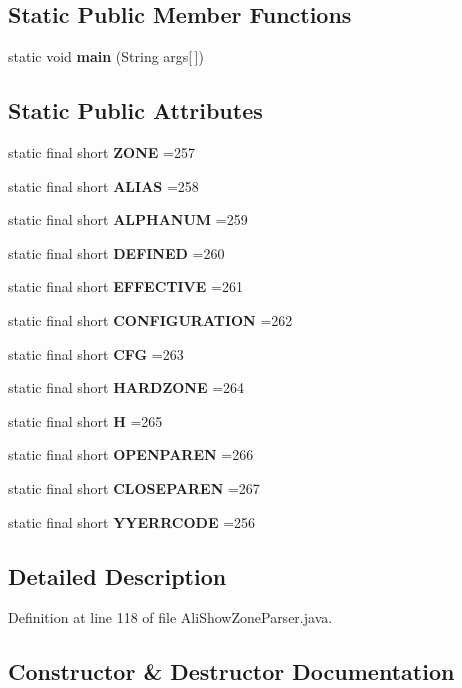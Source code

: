 \subsection*{Static Public Member Functions}
\begin{DoxyCompactItemize}
\item 
static void {\bf main} (String args[$\,$])
\end{DoxyCompactItemize}
\subsection*{Static Public Attributes}
\begin{DoxyCompactItemize}
\item 
static final short {\bf Z\+O\+N\+E} =257
\item 
static final short {\bf A\+L\+I\+A\+S} =258
\item 
static final short {\bf A\+L\+P\+H\+A\+N\+U\+M} =259
\item 
static final short {\bf D\+E\+F\+I\+N\+E\+D} =260
\item 
static final short {\bf E\+F\+F\+E\+C\+T\+I\+V\+E} =261
\item 
static final short {\bf C\+O\+N\+F\+I\+G\+U\+R\+A\+T\+I\+O\+N} =262
\item 
static final short {\bf C\+F\+G} =263
\item 
static final short {\bf H\+A\+R\+D\+Z\+O\+N\+E} =264
\item 
static final short {\bf H} =265
\item 
static final short {\bf O\+P\+E\+N\+P\+A\+R\+E\+N} =266
\item 
static final short {\bf C\+L\+O\+S\+E\+P\+A\+R\+E\+N} =267
\item 
static final short {\bf Y\+Y\+E\+R\+R\+C\+O\+D\+E} =256
\end{DoxyCompactItemize}


\subsection{Detailed Description}


Definition at line 118 of file Ali\+Show\+Zone\+Parser.\+java.



\subsection{Constructor \& Destructor Documentation}
